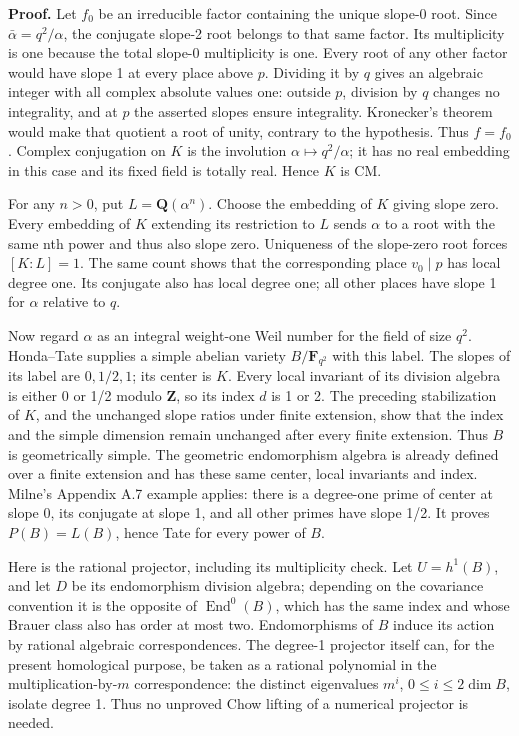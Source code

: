 \textbf{Proof.} Let \(f_0\) be an irreducible factor containing the
unique slope-0 root. Since \(\bar\alpha=q^2/\alpha\), the conjugate
slope-2 root belongs to that same factor. Its multiplicity is one
because the total slope-0 multiplicity is one. Every root of any
other factor would have slope 1 at every place above \(p\). Dividing
it by \(q\) gives an algebraic integer with all complex absolute
values one: outside \(p\), division by \(q\) changes no integrality,
and at \(p\) the asserted slopes ensure integrality. Kronecker's
theorem would make that quotient a root of unity, contrary to the
hypothesis. Thus \(f=f_0\). Complex conjugation on \(K\) is the
involution \(\alpha\mapsto q^2/\alpha\); it has no real embedding
in this case and its fixed field is totally real. Hence \(K\) is CM.

For any \(n>0\), put \(L=\mathbf Q(\alpha^n)\). Choose the embedding
of \(K\) giving slope zero. Every embedding of \(K\) extending its
restriction to \(L\) sends \(\alpha\) to a root with the same nth
power and thus also slope zero. Uniqueness of the slope-zero root
forces \([K:L]=1\). The same count shows that the corresponding
place \(v_0\mid p\) has local degree one. Its conjugate also has
local degree one; all other places have slope 1 for \(\alpha\) relative
to \(q\).

Now regard \(\alpha\) as an integral weight-one Weil number for the
field of size \(q^2\). Honda--Tate supplies a simple abelian variety
\(B/\mathbf F_{q^2}\) with this label. The slopes of its label are
\(0,1/2,1\); its center is \(K\). Every local invariant of its
division algebra is either 0 or 1/2 modulo \(\mathbf Z\), so its
index \(d\) is 1 or 2. The preceding stabilization of \(K\), and the
unchanged slope ratios under finite extension, show that the index and
the simple dimension remain unchanged after every finite extension.
Thus \(B\) is geometrically simple. The geometric endomorphism algebra
is already defined over a finite extension and has these same center,
local invariants and index. Milne's Appendix A.7 example applies:
there is a degree-one prime of center at slope 0, its conjugate at
slope 1, and all other primes have slope 1/2. It proves
\(P(B)=L(B)\), hence Tate for every power of \(B\).

Here is the rational projector, including its multiplicity check.
Let \(U=h^1(B)\), and let \(D\) be its endomorphism division algebra;
depending on the covariance convention it is the opposite of
\(\operatorname{End}^0(B)\), which has the same index and whose Brauer
class also has order at most two. Endomorphisms of \(B\) induce its
action by rational algebraic correspondences. The degree-1 projector
itself can, for the present homological purpose, be taken as a
rational polynomial in the multiplication-by-\(m\) correspondence:
the distinct eigenvalues \(m^i\), \(0\leq i\leq2\dim B\), isolate
degree 1. Thus no unproved Chow lifting of a numerical projector is
needed.

